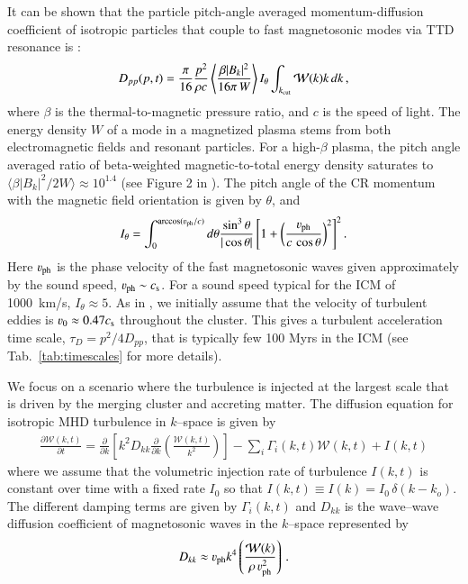 \documentclass[fleqn,usenatbib,useAMS]{mnras}
\newcommand{\Vph}{\varv_\mathrm{ph}}
\begin{document}
It can be shown that the particle pitch-angle averaged
momentum-diffusion coefficient of isotropic particles that couple to
fast magnetosonic modes via TTD resonance is \citep[][
  Eqn. 47]{brunetti07}:
\begin{eqnarray}
  D_{pp}(p,t) = \frac{\pi}{16} \frac{p^2}{\rho c}
  \left\langle\frac{\beta |B_k|^2}{16 \pi \,W}\right\rangle
  I_\theta
  \int_{k_{\mathrm{cut}}}\mathcal{W}(k)k\,d k\,,
\label{eq:dpp}
\end{eqnarray}
where $\beta$ is the thermal-to-magnetic pressure ratio, and $c$
is the speed of light. The energy density $W$ of a mode in a
magnetized plasma stems from both electromagnetic fields and resonant
particles. For a high-$\beta$ plasma, the pitch angle averaged ratio of
beta-weighted magnetic-to-total energy density saturates to $\langle\beta
|B_k|^2/2W\rangle\approx 10^{1.4}$ (see Figure 2 in
\citealt{brunetti07}). The pitch angle of the CR momentum with the
magnetic field orientation is given by $\theta$, and
\begin{equation}
  \label{eq:I_theta}
  I_\theta=\int_0^{\arccos(\Vph/c)} d\theta {\frac{ \sin^3 \theta }{
    |\cos \theta | }}
\left[1+\left(\frac{\Vph}{c\,\cos{\theta}}\right)^2\right]^2.
\end{equation}
Here $\Vph$ is the phase velocity of the fast magnetosonic waves
given approximately by the sound speed, $\Vph \sim c_\rmn{s}$. For a
sound speed typical for the ICM of 1000~km/s, $I_\theta\approx5$. As
in \cite{brunetti07}, we initially assume that the velocity of
turbulent eddies is $\varv_0\approx 0.47 c_\rmn{s}$ throughout the
cluster. This gives a turbulent acceleration time scale, $\tau_{D} =
p^2/4D_{pp}$, that is typically few 100 Myrs in the ICM (see
Tab.~\ref{tab:timescales} for more details).

We focus on a scenario where the turbulence is injected at the largest
scale that is driven by the merging cluster and accreting matter. The
diffusion equation for isotropic MHD turbulence in $k$--space is given
by
\begin{equation}
  \begin{aligned}
\frac{\partial {\mathcal W}(k,t)}{\partial t}
=
\frac{\partial}{\partial k}
\left[
k^2 D_{kk}
\frac{\partial}{\partial k}
\left( \frac{{\mathcal W}(k,t)}{k^2} \right)
\right]
- \sum_i \Gamma_i (k,t) {\mathcal W}(k,t)
+ I(k,t)
\end{aligned}
\label{modes_kinetic}
\end{equation}
where we assume that the volumetric injection rate of turbulence
$I(k,t)$ is constant over time with a fixed rate $I_0$ so that $I(k,t)
\equiv I(k) = I_0\,\delta (k - k_o)$. The different damping terms are
given by $\Gamma_i(k,t)$ and $D_{kk}$ is the wave--wave diffusion
coefficient of magnetosonic waves in the $k$--space represented by
\begin{equation}
  \label{eq:Dkk}
  D_{kk} \approx \Vph k^4
  \left(\frac{\mathcal{W}(k)}{\rho\,\Vph^2}\right)\,.
\end{equation}
\end{document}
